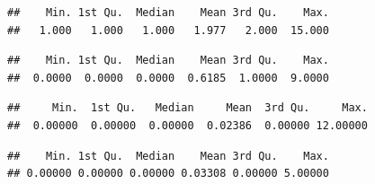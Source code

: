 \documentclass[12pt,]{article}
\newenvironment{Shaded}{\begin{snugshade}}{\end{snugshade}}
\newcommand{\KeywordTok}[1]{\textcolor[rgb]{0.13,0.29,0.53}{\textbf{#1}}}
\newcommand{\OperatorTok}[1]{\textcolor[rgb]{0.81,0.36,0.00}{\textbf{#1}}}
\newcommand{\NormalTok}[1]{#1}
\begin{document}
\begin{Shaded}
\end{Shaded}

\begin{verbatim}
##    Min. 1st Qu.  Median    Mean 3rd Qu.    Max. 
##   1.000   1.000   1.000   1.977   2.000  15.000
\end{verbatim}

\begin{Shaded}
\end{Shaded}

\begin{verbatim}
##    Min. 1st Qu.  Median    Mean 3rd Qu.    Max. 
##  0.0000  0.0000  0.0000  0.6185  1.0000  9.0000
\end{verbatim}

\begin{Shaded}
\end{Shaded}

\begin{verbatim}
##     Min.  1st Qu.   Median     Mean  3rd Qu.     Max. 
##  0.00000  0.00000  0.00000  0.02386  0.00000 12.00000
\end{verbatim}

\begin{Shaded}
\end{Shaded}

\begin{verbatim}
##    Min. 1st Qu.  Median    Mean 3rd Qu.    Max. 
## 0.00000 0.00000 0.00000 0.03308 0.00000 5.00000
\end{verbatim}

\begin{Shaded}
\end{Shaded}
\end{document}
